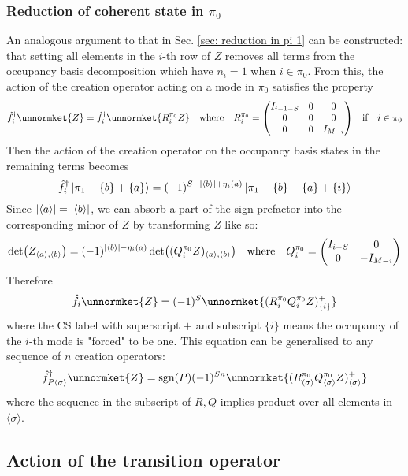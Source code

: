 \documentclass[12pt]{article}
\newcommand{\sgn}{\text{sgn}}
\newcommand{\seq}[1]{\langle #1\rangle}
\newcommand{\hc}{^\dagger}
\begin{document}
	\subsubsection{Reduction of coherent state in $\pi_0$}
	An analogous argument to that in Sec. \ref{sec: reduction in pi 1} can be constructed: that setting all elements in the $i$-th row of $Z$ removes all terms from the occupancy basis decomposition which have $n_i=1$ when $i\in\pi_0$. From this, the action of the creation operator acting on a mode in $\pi_0$ satisfies the property
	\begin{equation}
	\hat{f}\hc_i\unnormket{Z}=\hat{f}\hc_i\unnormket{R^{\pi_0}_iZ}\qq{where}R^{\pi_0}_i=\mqty(\dmat[0]{I_{i-1-S}, 0, I_{M-i}})\qq{if}i\in\pi_0
	\end{equation}
	Then the action of the creation operator on the occupancy basis states in the remaining terms becomes
	\begin{equation}
	\hat{f}\hc_i\ket{\pi_1-\{b\}+\{a\}}=(-1)^{S-\abs{\seq{b}}+\eta_i(a)}\ket{\pi_1-\{b\}+\{a\}+\{i\}}
	\end{equation}
	Since $\abs{\seq{a}}=\abs{\seq{b}}$, we can absorb a part of the sign prefactor into the corresponding minor of $Z$ by transforming $Z$ like so:
	\begin{equation}
	\det(Z_{\seq{a},\seq{b}})=(-1)^{\abs{\seq{b}}-\eta_i(a)}\det((Q^{\pi_0}_iZ)_{\seq{a},\seq{b}})\qq{where}Q^{\pi_0}_i=\mqty(\dmat[0]{I_{i-S}, -I_{M-i}})
	\end{equation}
	Therefore
	\begin{equation}
	\hat{f}_i\unnormket{Z}=(-1)^{S}\unnormket{(R^{\pi_0}_iQ^{\pi_0}_iZ)^+_{\{i\}}}
	\end{equation}
	where the CS label with superscript $+$ and subscript $\{i\}$ means the occupancy of the $i$-th mode is "forced" to be one. This equation can be generalised to any sequence of $n$ creation operators:
	\begin{equation}
	\hat{f}\hc_{P\seq{\sigma}}\unnormket{Z}=\sgn(P)(-1)^{Sn}\unnormket{(R^{\pi_0}_{\seq{\sigma}}Q^{\pi_0}_{\seq{\sigma}}Z)^{+}_{\seq{\sigma}}}
	\end{equation}
	where the sequence in the subscript of $R, Q$ implies product over all elements in $\seq{\sigma}$.
	
	\subsection{Action of the transition operator}
	
\end{document}
